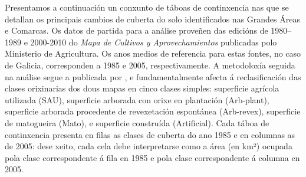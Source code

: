 \documentclass[11pt,a4paper]{article}
\begin{document}
Presentamos a continuación un conxunto de táboas de continxencia nas que se detallan os principais cambios de cuberta do solo identificados nas Grandes Áreas e Comarcas. Os datos de partida para a análise proveñen das edicións de 1980--1989 e 2000-2010 do \emph{Mapa de Cultivos y Aprovechamientos} publicadas polo Ministerio de Agricultura. Os anos medios de referencia para estas fontes, no caso de Galicia, corresponden a 1985 e 2005, respectivamente. A metodoloxía seguida na análise segue a publicada por \citet{Corbelle2014RGE}, e fundamentalmente afecta á reclasificación das clases orixinarias dos dous mapas en cinco clases simples: superficie agrícola utilizada (SAU), superficie arborada con orixe en plantación (Arb-plant), superficie arborada procedente de revexetación espontánea (Arb-revex), superficie de matogueira (Mato), e superficie construída (Artificial). Cada táboa de continxencia presenta en filas as clases de cuberta do ano 1985 e en columnas as de 2005: dese xeito, cada cela debe interpretarse como a área (en km²) ocupada pola clase correspondente á fila en 1985 e pola clase correspondente á columna en 2005.

\clearpage

\begin{small}

%
\end{small}
\end{document}
